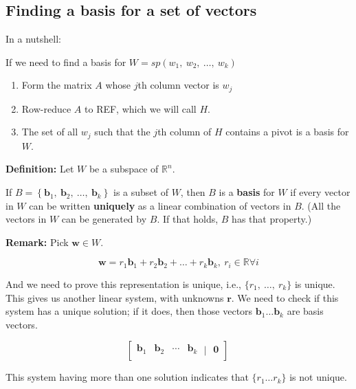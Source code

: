 \documentclass[
]{article}
\begin{document}
\subsection{Finding a basis for a set of
vectors}

In a nutshell:

If we need to find a basis for
$W = sp\left( w_{1},\ w_{2},\ \ldots,\ w_{k} \right)$

\begin{enumerate}
\def\labelenumi{\arabic{enumi}.}
\item
  Form the matrix $A$ whose $j$th column vector is $w_{j}$
\item
  Row-reduce $A$ to REF, which we will call $H$.
\item
  The set of all $w_{j}$ such that the $j$th column of $H$
  contains a pivot is a basis for $W$.
\end{enumerate}

\textbf{Definition:} Let $W$ be a subspace of $\mathbb{R}^{n}$.

If
$Β = \left\{ {\mathbf{b}}_{1},\ {\mathbf{b}}_{2},\ \ldots,\ {\mathbf{b}}_{k} \right\}$
is a subset of $W$, then $B$ is a \textbf{basis} for $W$ if every
vector in $W$ can be written \textbf{uniquely} as a linear combination
of vectors in $B$. (All the vectors in $W$ can be generated by
$B$. If that holds, $B$ has that property.)

\textbf{Remark:} Pick $\mathbf{w} \in W$.

$$\mathbf{w} = r_{1}{\mathbf{b}}_{1} + r_{2}{\mathbf{b}}_{2} + \ldots + r_{k}{\mathbf{b}}_{k},\ r_{i}\mathbb{\in R\forall}i$$

And we need to prove this representation is unique, i.e.,
$\{ r_{1},\ \ldots,\ r_{k}\}$ is unique. This gives us another linear
system, with unknowns $\mathbf{r}$. We need to check if this
system has a unique solution; if it does, then those vectors
${\mathbf{b}}_{1}\ldots{\mathbf{b}}_{k}$ are basis vectors.

$$\left\lbrack \begin{matrix}
{\mathbf{b}}_{1} & {\mathbf{b}}_{2} & \cdots & {\mathbf{b}}_{k} \\
\end{matrix}\mid\begin{matrix}
\mathbf{0} \\
\end{matrix} \right\rbrack\ $$

This system having more than one solution indicates that
$\{ r_{1}\ldots r_{k}\}$ is not unique.
\end{document}
